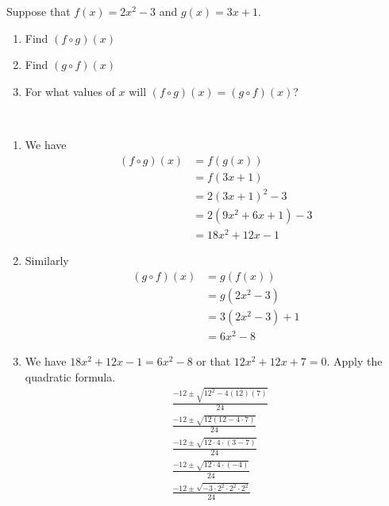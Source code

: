 \begin{exercise}
  Suppose that \( f(x)=2x^{2}-3 \) and \( g(x) = 3x+1 \). 
  \begin{enumerate}[label=\textbf{\roman*)}]
    \item Find \( \left( f \circ g \right)(x) \)
    \item Find \( \left( g \circ f \right)(x) \)
    \item For what values of \( x \) will \(   \left( f \circ g \right)(x) = \left( g \circ f \right)(x)\)?
  \end{enumerate}
\end{exercise}
\begin{solution}
    $ $\vspace{-1.5em}
    \begin{enumerate}[label=\textbf{\roman*)}]
      \item We have 
      \begin{align*}
        \left( f \circ g \right) \left( x \right) &= f(g(x)) \\
        &= f \left( 3x+1 \right) \\
        &= 2 \left( 3x+1 \right)^{2} -3 \\
        &= 2 \left( 9x^{2} +6x+1 \right)-3 \\
        &= 18x^{2}+12x -1
      \end{align*}
      \item Similarly 
      \begin{align*}
        \left( g \circ f \right)(x) &= g \left( f(x) \right) \\
        &= g \left( 2x^{2} -3\right) \\
        &= 3 \left( 2x^{2}-3 \right) +1 \\
        &= 6x^{2}-8
      \end{align*}
      \item We have \( 18x^{2}+12x-1=6x^{2}-8 \) or that \( 12x^{2} + 12x +7=0 \). Apply the quadratic formula. 
      \begin{align*}
        &\frac{-12 \pm \sqrt{12^{2} - 4(12)(7)}}{24} \\
        & \frac{-12 \pm \sqrt{12 \left( 12 - 4 \cdot 7 \right)}}{24} \\
        & \frac{-12 \pm \sqrt{12 \cdot 4 \cdot \left( 3-7 \right)}}{24}\\
        & \frac{-12 \pm \sqrt{12 \cdot 4 \cdot \left(-4\right)}}{24} \\
        &  \frac{-12 \pm \sqrt{-3 \cdot 2^{2} \cdot 2^{2} \cdot 2^{2}}}{24} \\

\end{align*}
\end{enumerate}
\end{solution}
